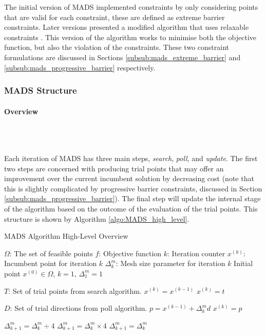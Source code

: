 The initial version of \ac{MADS} implemented constraints by only considering points that are valid for each constraint, these are defined as extreme barrier constraints. Later versions presented a modified algorithm that uses relaxable constraints \cite{Audet2009AProgramming}. This version of the algorithm works to minimise both the objective function, but also the violation of the constraints. These two constraint formulations are discussed in Sections \ref{subsub:mads_extreme_barrier} and \ref{subsub:mads_progressive_barrier} respectively.

\subsubsection{MADS Structure}
\paragraph{Overview}\\\

Each iteration of \ac{MADS} has three main steps, \textit{search}, \textit{poll}, and \textit{update}. The first two steps are concerned with producing trial points that may offer an improvement over the current incumbent solution by decreasing cost (note that this is slightly complicated by progressive barrier constraints, discussed in Section \ref{subsub:mads_progressive_barrier}). The final step will update the internal stage of the algorithm based on the outcome of the evaluation of the trial points. This structure is shown by Algorithm \ref{algo:MADS_high_level}.

\begin{algorithm}
\caption{MADS Algorithm High-Level Overview}
\label{algo:MADS_high_level}
\begin{algorithmic}
\STATE $\Omega$: The set of feasible points
\STATE $f$: Objective function
\STATE $k$: Iteration counter
\STATE $x^{(k)}$: Incumbent point for iteration $k$
\STATE $\Delta^m_k$: Mesh size parameter for iteration $k$
\REQUIRE Initial point $x^{(0)} \in \Omega$, $k=1$, $\Delta^m_1=1$

\REPEAT
    \STATE $T$: Set of trial points from search algorithm.
    \STATE $x^{(k)} = x^{(k-1)}$
            \STATE $x^{(k)} = t$
        \ENDIF
    \ENDFOR
    
    \STATE $D$: Set of trial directions from poll algorithm.
        \STATE $p = x^{(k-1)} + \Delta^m_kd$
            \STATE $x^{(k)} = p$
        \ENDIF
    \ENDFOR
    
        \STATE $\Delta_{k+1}^m = \Delta_{k}^m \div 4$
        \STATE $\Delta_{k+1}^m = \Delta_{k}^m \times 4$
    \ELSE
        \STATE $\Delta_{k+1}^m = \Delta_{k}^m$
    \ENDIF
{}

\end{algorithmic}
\end{algorithm}


